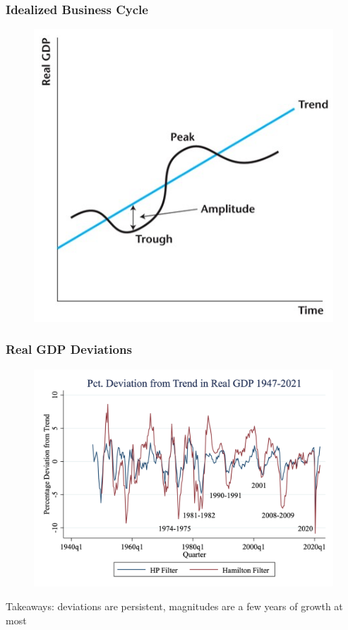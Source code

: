 \documentclass{beamer}
\begin{document}
\begin{frame}
\frametitle[alignment=center]{Idealized Business Cycle}
\begin{figure}
\centering
\includegraphics[scale=0.7]{Figures/W_Fig_3pt1.png}
\end{figure}
\end{frame}



\begin{frame}
\frametitle[alignment=center]{Real GDP Deviations}
\begin{figure}
\centering
\includegraphics[scale=0.25]{Figures/Fig_3pt2.png}
\end{figure}
Takeaways:  deviations are persistent, magnitudes are a few years of growth at most
\end{frame}
\end{document}
